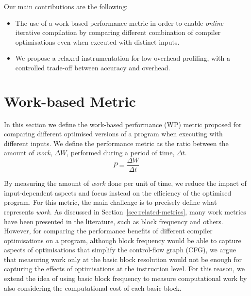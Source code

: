 \documentclass[sigplan,10pt]{acmart}
\theoremstyle{definition}
\newcommand{\itercomp}{{iterative compilation}}
\begin{document}
Our main contributions are the following:
\begin{itemize}
\item The use of a work-based performance metric in order to enable \textit{online} {\itercomp} by comparing different combination of compiler optimisations even when executed with distinct inputs.
\item We propose a relaxed instrumentation for low overhead profiling, with a controlled trade-off between accuracy and overhead.
\end{itemize}

\section{Work-based Metric} \label{sec:metric}

In this section we define the work-based performance (WP) metric proposed for comparing different optimised versions of a program when executing with different inputs.
We define the performance metric as the ratio between the amount of \textit{work}, $\Delta W$, performed during a period of time, $\Delta t$.
\[
   P = \frac{\Delta W}{\Delta t}
\]

By measuring the amount of \textit{work} done per unit of time, we reduce the impact of input-dependent aspects and focus instead on the efficiency of the optimised program.
For this metric, the main challenge is to precisely define what represents \textit{work}.
As discussed in Section~\ref{sec:related-metrics}, many work metrics have been presented in the literature, such as block frequency and others.
However, for comparing the performance benefits of different compiler optimisations on a program, although block frequency would be able to capture aspects of optimisations that simplify the control-flow graph (CFG), we argue that measuring work only at the basic block resolution would not be enough for capturing the effects of optimisations at the instruction level.
For this reason, we extend the idea of using basic block frequency to measure computational work by also considering the computational cost of each basic block.
\end{document}
